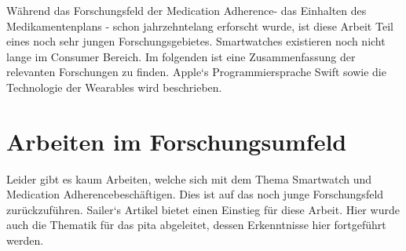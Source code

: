 

Während das Forschungsfeld der \glqq Medication Adherence\grqq - das Einhalten des Medikamentenplans - schon jahrzehntelang erforscht wurde, ist diese Arbeit Teil eines noch sehr jungen Forschungsgebietes. Smartwatches existieren noch nicht lange im Consumer Bereich. Im folgenden ist eine Zusammenfassung der relevanten Forschungen zu finden. Apple`s Programmiersprache Swift sowie die Technologie der Wearables wird beschrieben.
\section{Arbeiten im Forschungsumfeld}
Leider gibt es kaum Arbeiten, welche sich mit dem Thema Smartwatch und \glqq Medication Adherence\grqq   beschäftigen. Dies ist auf das noch junge Forschungsfeld zurückzuführen. Sailer`s Artikel \cite{Fabian-Sailer:2015aa} bietet einen Einstieg für diese Arbeit. Hier wurde auch die Thematik für das \gls{pita} abgeleitet, dessen Erkenntnisse hier fortgeführt werden. 

